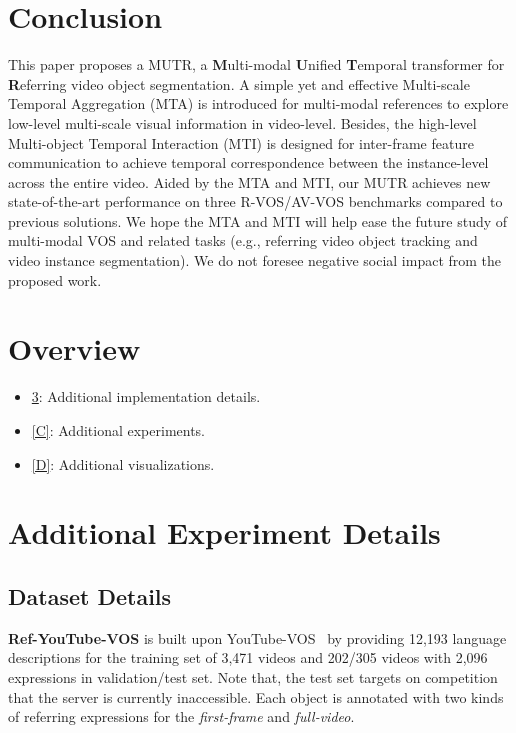 \documentclass{article}
\begin{document}
\section{Conclusion}
This paper proposes a MUTR, a \textbf{M}ulti-modal \textbf{U}nified \textbf{T}emporal transformer for \textbf{R}eferring video object segmentation. A simple yet and effective Multi-scale Temporal Aggregation (MTA) is introduced for multi-modal references to explore low-level multi-scale visual information in video-level. Besides, the high-level Multi-object Temporal Interaction (MTI) is designed for inter-frame feature communication to achieve temporal correspondence between the instance-level across the entire video. Aided by the MTA and MTI, our MUTR achieves new state-of-the-art performance on three R-VOS/AV-VOS benchmarks compared to previous solutions.
We hope the MTA and MTI will help ease the future study of multi-modal VOS and related tasks (e.g., referring video object tracking and video instance segmentation). We do not foresee negative social impact from the proposed work.



\clearpage

\appendix
\section{Overview}
\begin{itemize}
    \item \cref{B}: Additional implementation details.
    \item \cref{C}: Additional experiments.
    \item \cref{D}: Additional visualizations.
\end{itemize}

\section{Additional Experiment Details}
\label{B}
\subsection{Dataset Details}
\textbf{Ref-YouTube-VOS} is built upon YouTube-VOS~\cite{xu2018youtube} by providing 12,193 language descriptions for the training set of 3,471 videos and 202/305 videos with 2,096 expressions in validation/test set. Note that, the test set targets on competition that the server is currently inaccessible. Each object is annotated with two kinds of referring expressions for the \textit{first-frame} and \textit{full-video}.
\end{document}

